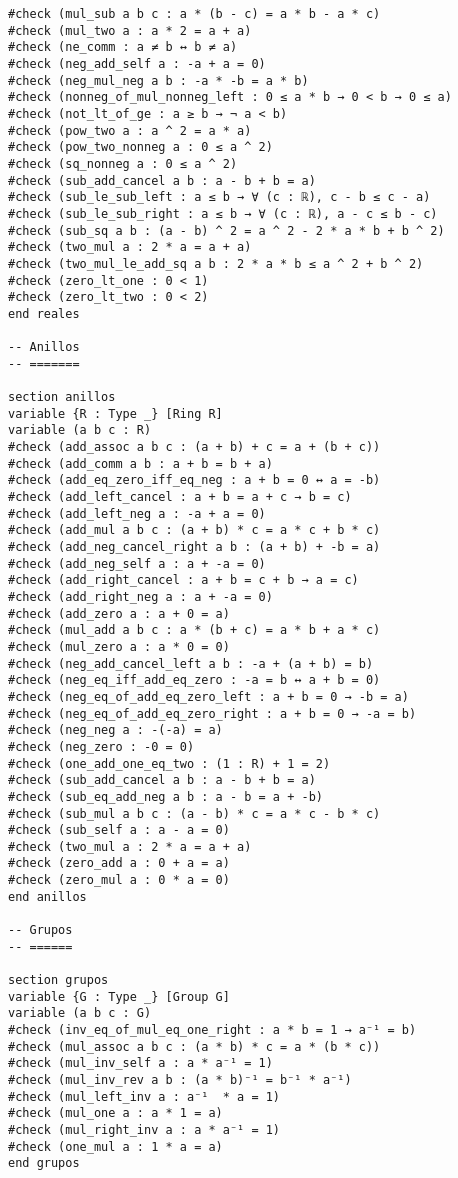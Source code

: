 \begin{verbatim}
#check (mul_sub a b c : a * (b - c) = a * b - a * c)
#check (mul_two a : a * 2 = a + a)
#check (ne_comm : a ≠ b ↔ b ≠ a)
#check (neg_add_self a : -a + a = 0)
#check (neg_mul_neg a b : -a * -b = a * b)
#check (nonneg_of_mul_nonneg_left : 0 ≤ a * b → 0 < b → 0 ≤ a)
#check (not_lt_of_ge : a ≥ b → ¬ a < b)
#check (pow_two a : a ^ 2 = a * a)
#check (pow_two_nonneg a : 0 ≤ a ^ 2)
#check (sq_nonneg a : 0 ≤ a ^ 2)
#check (sub_add_cancel a b : a - b + b = a)
#check (sub_le_sub_left : a ≤ b → ∀ (c : ℝ), c - b ≤ c - a)
#check (sub_le_sub_right : a ≤ b → ∀ (c : ℝ), a - c ≤ b - c)
#check (sub_sq a b : (a - b) ^ 2 = a ^ 2 - 2 * a * b + b ^ 2)
#check (two_mul a : 2 * a = a + a)
#check (two_mul_le_add_sq a b : 2 * a * b ≤ a ^ 2 + b ^ 2)
#check (zero_lt_one : 0 < 1)
#check (zero_lt_two : 0 < 2)
end reales

-- Anillos
-- =======

section anillos
variable {R : Type _} [Ring R]
variable (a b c : R)
#check (add_assoc a b c : (a + b) + c = a + (b + c))
#check (add_comm a b : a + b = b + a)
#check (add_eq_zero_iff_eq_neg : a + b = 0 ↔ a = -b)
#check (add_left_cancel : a + b = a + c → b = c)
#check (add_left_neg a : -a + a = 0)
#check (add_mul a b c : (a + b) * c = a * c + b * c)
#check (add_neg_cancel_right a b : (a + b) + -b = a)
#check (add_neg_self a : a + -a = 0)
#check (add_right_cancel : a + b = c + b → a = c)
#check (add_right_neg a : a + -a = 0)
#check (add_zero a : a + 0 = a)
#check (mul_add a b c : a * (b + c) = a * b + a * c)
#check (mul_zero a : a * 0 = 0)
#check (neg_add_cancel_left a b : -a + (a + b) = b)
#check (neg_eq_iff_add_eq_zero : -a = b ↔ a + b = 0)
#check (neg_eq_of_add_eq_zero_left : a + b = 0 → -b = a)
#check (neg_eq_of_add_eq_zero_right : a + b = 0 → -a = b)
#check (neg_neg a : -(-a) = a)
#check (neg_zero : -0 = 0)
#check (one_add_one_eq_two : (1 : R) + 1 = 2)
#check (sub_add_cancel a b : a - b + b = a)
#check (sub_eq_add_neg a b : a - b = a + -b)
#check (sub_mul a b c : (a - b) * c = a * c - b * c)
#check (sub_self a : a - a = 0)
#check (two_mul a : 2 * a = a + a)
#check (zero_add a : 0 + a = a)
#check (zero_mul a : 0 * a = 0)
end anillos

-- Grupos
-- ======

section grupos
variable {G : Type _} [Group G]
variable (a b c : G)
#check (inv_eq_of_mul_eq_one_right : a * b = 1 → a⁻¹ = b)
#check (mul_assoc a b c : (a * b) * c = a * (b * c))
#check (mul_inv_self a : a * a⁻¹ = 1)
#check (mul_inv_rev a b : (a * b)⁻¹ = b⁻¹ * a⁻¹)
#check (mul_left_inv a : a⁻¹  * a = 1)
#check (mul_one a : a * 1 = a)
#check (mul_right_inv a : a * a⁻¹ = 1)
#check (one_mul a : 1 * a = a)
end grupos


\end{verbatim}
